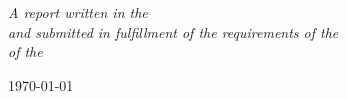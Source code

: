 \documentclass[
11pt, %
english, %
singlespacing, %
headsepline, %
]{MastersDoctoralThesis} %
\begin{document}
\begin{titlepage}
\begin{center}
\vfill

\large \textit{A report written in the \groupname \\ and submitted in fulfillment of the requirements of the \degreename \\ of the \deptname}\\[0.3cm] %

\vfill

{\large \today}\\[4cm] %

\vfill
\end{center}
\end{titlepage}


%
%
%
%
\end{document}
